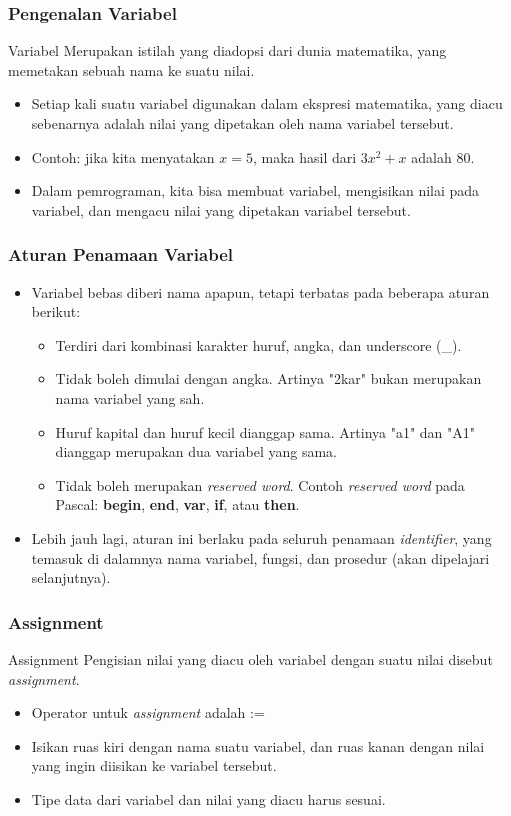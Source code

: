 \documentclass{beamer}
\begin{document}
\begin{frame}[b]
\frametitle{Pengenalan Variabel}
\begin{block}{Variabel}
     Merupakan istilah yang diadopsi dari dunia matematika, yang memetakan sebuah nama ke suatu nilai.
\end{block}
\begin{itemize}
    \item Setiap kali suatu variabel digunakan dalam ekspresi matematika, yang diacu sebenarnya adalah nilai yang dipetakan oleh nama variabel tersebut.
    \item Contoh: jika kita menyatakan $x=5$, maka hasil dari $3x^2 + x$ adalah $80$.
    \item Dalam pemrograman, kita bisa membuat variabel, mengisikan nilai pada variabel, dan mengacu nilai yang dipetakan variabel tersebut.
\end{itemize}
\end{frame}

\begin{frame}
\frametitle{Aturan Penamaan Variabel}
\begin{itemize}
    \item Variabel bebas diberi nama apapun, tetapi terbatas pada beberapa aturan berikut:
    \begin{itemize}
        \item Terdiri dari kombinasi karakter huruf, angka, dan underscore (\_).
        \item Tidak boleh dimulai dengan angka. Artinya "2kar" bukan merupakan nama variabel yang sah.
        \item Huruf kapital dan huruf kecil dianggap sama. Artinya "a1" dan "A1" dianggap merupakan dua variabel yang sama.
        \item Tidak boleh merupakan \alert{\textit{reserved word}}. Contoh \textit{reserved word} pada Pascal: \textbf{begin}, \textbf{end}, \textbf{var}, \textbf{if}, atau \textbf{then}.
    \end{itemize}
    \item Lebih jauh lagi, aturan ini berlaku pada seluruh penamaan \alert{\textit{identifier}}, yang temasuk di dalamnya nama variabel, fungsi, dan prosedur (akan dipelajari selanjutnya).
\end{itemize}
\end{frame}

\begin{frame}
\frametitle{Assignment}
\begin{block}{Assignment}
    Pengisian nilai yang diacu oleh variabel dengan suatu nilai disebut \alert{\textit{assignment}.}
\end{block}
\begin{itemize}
    \item Operator untuk \textit{assignment} adalah :=
    \item Isikan ruas kiri dengan nama suatu variabel, dan ruas kanan dengan nilai yang ingin diisikan ke variabel tersebut.
    \item Tipe data dari variabel dan nilai yang diacu \alert{harus sesuai}.
\end{itemize}
\end{frame}
\end{document}
